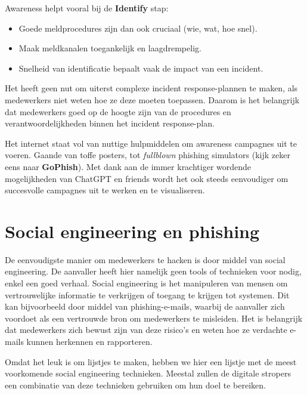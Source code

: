 \documentclass[
  10pt,
  dutch,
  paper=a4,
  ,captions=tableheading
]{scrbook}
\providecommand{\tightlist}{%
  \setlength{\itemsep}{0pt}\setlength{\parskip}{0pt}}
\begin{document}
Awareness helpt vooral bij de \textbf{Identify} stap:

\begin{itemize}
\tightlist
\item
  Goede meldprocedures zijn dan ook cruciaal (wie, wat, hoe snel).
\item
  Maak meldkanalen toegankelijk en laagdrempelig.
\item
  Snelheid van identificatie bepaalt vaak de impact van een incident.
\end{itemize}

\begin{tipblock}
Het heeft geen nut om uiterst complexe incident response-plannen te
maken, als medewerkers niet weten hoe ze deze moeten toepassen. Daarom
is het belangrijk dat medewerkers goed op de hoogte zijn van de
procedures en verantwoordelijkheden binnen het incident response-plan.
\end{tipblock}

\begin{tipblock}
Het internet staat vol van nuttige hulpmiddelen om awareness campagnes
uit te voeren. Gaande van toffe posters, tot \emph{fullblown} phishing
simulators (kijk zeker eens naar \textbf{GoPhish}). Met dank aan de
immer krachtiger wordende mogelijkheden van ChatGPT en friends wordt het
ook steeds eenvoudiger om succesvolle campagnes uit te werken en te
visualiseren.
\end{tipblock}

\section{Social engineering en
phishing}\label{social-engineering-en-phishing}

De eenvoudigste manier om medewerkers te hacken is door middel van
social engineering. De aanvaller heeft hier namelijk geen tools of
technieken voor nodig, enkel een goed verhaal. Social engineering is het
manipuleren van mensen om vertrouwelijke informatie te verkrijgen of
toegang te krijgen tot systemen. Dit kan bijvoorbeeld door middel van
phishing-e-mails, waarbij de aanvaller zich voordoet als een vertrouwde
bron om medewerkers te misleiden. Het is belangrijk dat medewerkers zich
bewust zijn van deze risico's en weten hoe ze verdachte e-mails kunnen
herkennen en rapporteren.

Omdat het leuk is om lijstjes te maken, hebben we hier een lijstje met
de meest voorkomende social engineering technieken. Meestal zullen de
digitale stropers een combinatie van deze technieken gebruiken om hun
doel te bereiken.
\end{document}
